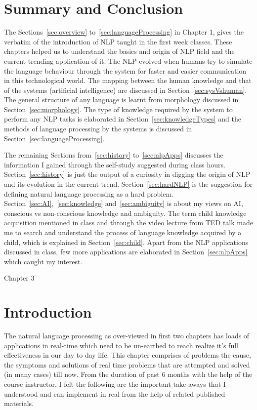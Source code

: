 \documentclass{bmcart}
\begin{document}
\section{Summary and Conclusion}
\label{sec:conclusion}

	The Sections~\ref{sec:overview} to~\ref{sec:languageProcessing} in Chapter 1, gives the verbatim of the introduction of NLP taught in the first week classes. These chapters helped us to understand the basics and origin of NLP field and the current trending application of it. The NLP evolved when humans try to simulate the language behaviour through the system for faster and easier communication in this technological world. The mapping between the human knowledge and that of the systems (artificial intelligence) are discussed in Section~\ref{sec:sysVshuman}. The general structure of any language is learnt from morphology discussed in Section~\ref{sec:morphology}. The type of knowledge required by the system to perform any NLP tasks is elaborated in Section~\ref{sec:knowledgeTypes} and the methods of language processing by the systems is discussed in Section~\ref{sec:languageProcessing}.
	
	The remaining Sections from~\ref{sec:history} to~\ref{sec:nlpApps} discusses the information I gained through the self-study suggested during class hours. Section~\ref{sec:history} is just the output of a curiosity in digging the origin of NLP and its evolution in the current trend. Section~\ref{sec:hardNLP} is the suggestion for defining natural language processing as a hard problem. Section~\ref{sec:AI},~\ref{sec:knowledge} and~\ref{sec:ambiguity} is about my views on AI, conscious vs non-conscious knowledge and ambiguity. The term child knowledge acquisition mentioned in class and through the video lecture from TED talk made me to search and understand the process of language knowledge acquired by a child, which is explained in Section~\ref{sec:child}. Apart from the NLP applications discussed in class, few more applications are elaborated in Section~\ref{sec:nlpApps} which caught my interest.

\newpage
\begin{center}
	\huge{Chapter 3}
\end{center}

\section{Introduction}
\label{sec:takeAway}

The natural language processing as over-viewed in 	first two chapters has loads of applications in 
real-time which need to be un-earthed to reach realize it's full effectiveness in our day to day 
life. This chapter comprises of problems the cause, the symptoms and solutions of real time 
problems that are attempted and solved (in many cases) till now. From the duration of past 6 months with the help of the course instructor, I felt the following are the important take-aways that I understood and  can implement in real from the help of related published materials.
\end{document}
